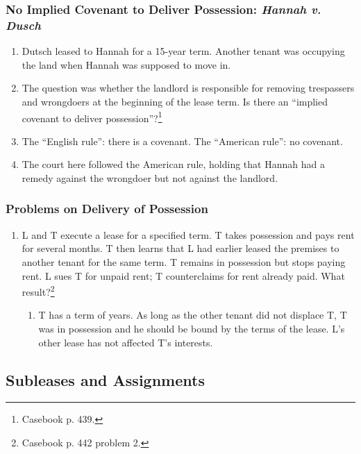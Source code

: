 \subsubsection{No Implied Covenant to Deliver Possession: \emph{Hannah v. 
Dusch}}

\begin{enumerate}
    \item Dutsch leased to Hannah for a 15-year term. Another tenant was 
    occupying the land when Hannah was supposed to move in.
    \item The question was whether the landlord is responsible for removing 
    trespassers and wrongdoers at the beginning of the lease term. Is there an 
    ``implied covenant to deliver possession''?\footnote{Casebook p. 439.}
    \item The ``English rule'': there is a covenant. The ``American rule'': no 
    covenant.
    \item The court here followed the American rule, holding that Hannah had a 
    remedy against the wrongdoer but not against the landlord.
\end{enumerate}

\subsubsection{Problems on Delivery of Possession}

\begin{enumerate}
    \item L and T execute a lease for a specified term. T takes possession and 
    pays rent for several months. T then learns that L had earlier leased the 
    premises to another tenant for the same term. T remains in possession but 
    stops paying rent. L sues T for unpaid rent; T counterclaims for rent 
    already paid. What result?\footnote{Casebook p. 442 problem 2.}
    \begin{enumerate}
        \item T has a term of years. As long as the other tenant did not 
        displace T, T was in possession and he should be bound by the terms of 
        the lease. L's other lease has not affected T's interests.
    \end{enumerate}
\end{enumerate}

\subsection{Subleases and Assignments}

